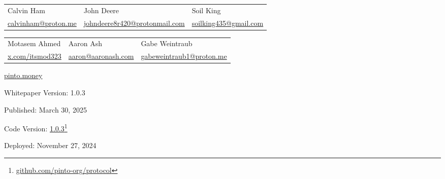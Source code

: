 \documentclass[tikz]{article}
\begin{document}
\begin{titlepage}
\begin{center}
        \vspace*{-0.52cm}

        \begin{center}
            \begin{tabular}{>{\centering\arraybackslash}p{4.6cm} >{\centering\arraybackslash}p{4.6cm} >{\centering\arraybackslash}p{4.6cm}}
                Calvin Ham & John Deere & Soil King \\
                 \href{mailto:calvinham@proton.me}{\normalsize{calvinham@proton.me}} & \href{mailto:johndeere8r420@protonmail.com}{\normalsize{johndeere8r420@protonmail.com}} & \href{mailto:soilking435@gmail.com}{\normalsize{soilking435@gmail.com}}
            \end{tabular}
        \end{center}

        \vspace*{-0.52cm}

        \begin{center}
            \begin{tabular}{>{\centering\arraybackslash}p{4.6cm} >{\centering\arraybackslash}p{4.6cm} >{\centering\arraybackslash}p{4.6cm}}
                Motasem Ahmed & Aaron Ash & Gabe Weintraub \\
                \href{https://x.com/itsmod323}{\normalsize{x.com/itsmod323}} & \href{mailto:aaron@aaronash.com}{\normalsize{aaron@aaronash.com}} & \href{mailto:gabeweintraub1@proton.me}{\normalsize{gabeweintraub1@proton.me}}
            \end{tabular}
        \end{center}


        \normalsize{\href{https://pinto.money/}{pinto.money}}

        \footnotesize{Whitepaper Version:} {\normalsize{1.0.3}}

        \vspace{-0.25cm}
        \footnotesize{Published:} {\normalsize{March 30, 2025}}

        \vspace{-0.25cm}
        \footnotesize{Code Version:} \href{https://github.com/pinto-org/protocol}{\normalsize{1.0.3}}\footnote{\href{https://github.com/pinto-org/protocol}{github.com/pinto-org/protocol}}

        \vspace{-0.25cm}
        \footnotesize{Deployed:} {\normalsize{November 27, 2024}}
        

\end{center}
\end{titlepage}
\end{document}
